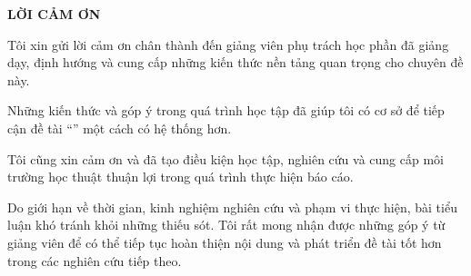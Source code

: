 \newpage
\thispagestyle{plain}

\begin{center}
    {\bfseries\Large LỜI CẢM ƠN}
\end{center}

\vspace{1cm}


Tôi xin gửi lời cảm ơn chân thành đến giảng viên phụ trách học phần \coursename{} đã giảng dạy,
định hướng và cung cấp những kiến thức nền tảng quan trọng cho chuyên đề này.

Những kiến thức và góp ý trong quá trình học tập đã giúp tôi có cơ sở để tiếp cận đề tài
``\projecttitle''
một cách có hệ thống hơn.

Tôi cũng xin cảm ơn \university{} và \faculty{} đã tạo điều kiện học tập, nghiên cứu và cung cấp
môi trường học thuật thuận lợi trong quá trình thực hiện báo cáo.

Do giới hạn về thời gian, kinh nghiệm nghiên cứu và phạm vi thực hiện, bài tiểu luận khó tránh
khỏi những thiếu sót. Tôi rất mong nhận được những góp ý từ giảng viên để có thể tiếp tục hoàn
thiện nội dung và phát triển đề tài tốt hơn trong các nghiên cứu tiếp theo.
